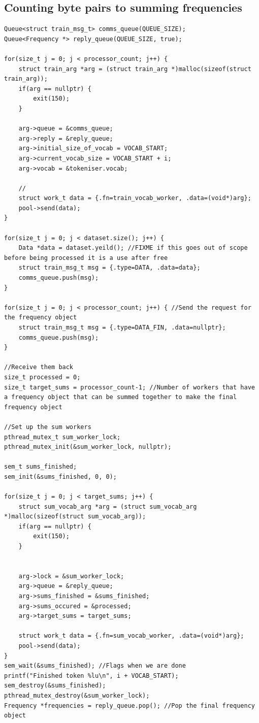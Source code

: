 \documentclass{article}
\begin{document}
\subsection{Counting byte pairs to summing frequencies}
\label{appendix:counting_to_summing}
\begin{verbatim}
Queue<struct train_msg_t> comms_queue(QUEUE_SIZE);
Queue<Frequency *> reply_queue(QUEUE_SIZE, true);

for(size_t j = 0; j < processor_count; j++) {
    struct train_arg *arg = (struct train_arg *)malloc(sizeof(struct train_arg));
    if(arg == nullptr) {
        exit(150);
    }

    arg->queue = &comms_queue;
    arg->reply = &reply_queue;
    arg->initial_size_of_vocab = VOCAB_START;
    arg->current_vocab_size = VOCAB_START + i;
    arg->vocab = &tokeniser.vocab;

    //
    struct work_t data = {.fn=train_vocab_worker, .data=(void*)arg};
    pool->send(data);
}

for(size_t j = 0; j < dataset.size(); j++) {
    Data *data = dataset.yeild(); //FIXME if this goes out of scope before being processed it is a use after free
    struct train_msg_t msg = {.type=DATA, .data=data};
    comms_queue.push(msg);
}

for(size_t j = 0; j < processor_count; j++) { //Send the request for the frequency object
    struct train_msg_t msg = {.type=DATA_FIN, .data=nullptr};
    comms_queue.push(msg);
}

//Receive them back
size_t processed = 0;
size_t target_sums = processor_count-1; //Number of workers that have a frequency object that can be summed together to make the final frequency object

//Set up the sum workers
pthread_mutex_t sum_worker_lock;
pthread_mutex_init(&sum_worker_lock, nullptr);

sem_t sums_finished;
sem_init(&sums_finished, 0, 0);

for(size_t j = 0; j < target_sums; j++) {
    struct sum_vocab_arg *arg = (struct sum_vocab_arg *)malloc(sizeof(struct sum_vocab_arg));
    if(arg == nullptr) {
        exit(150);
    }
    

    arg->lock = &sum_worker_lock;
    arg->queue = &reply_queue;
    arg->sums_finished = &sums_finished;
    arg->sums_occured = &processed;
    arg->target_sums = target_sums;

    struct work_t data = {.fn=sum_vocab_worker, .data=(void*)arg};
    pool->send(data);
}
sem_wait(&sums_finished); //Flags when we are done
printf("Finished token %lu\n", i + VOCAB_START);
sem_destroy(&sums_finished);
pthread_mutex_destroy(&sum_worker_lock);
Frequency *frequencies = reply_queue.pop(); //Pop the final frequency object
\end{verbatim}
\end{document}
